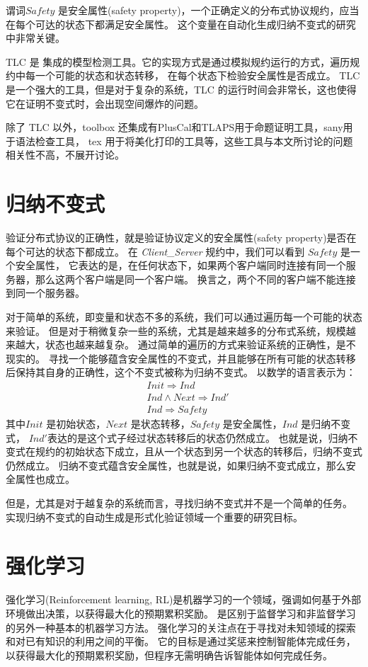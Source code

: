 谓词$Safety$ 是安全属性(safety property)，一个正确定义的分布式协议规约，应当在每个可达的状态下都满足安全属性。
这个变量在自动化生成归纳不变式的研究中非常关键。

TLC 是 \TLA 集成的模型检测工具。它的实现方式是通过模拟规约运行的方式，遍历规约中每一个可能的状态和状态转移，
在每个状态下检验安全属性是否成立。
TLC 是一个强大的工具，但是对于复杂的系统，TLC 的运行时间会非常长，这也使得它在证明不变式时，会出现空间爆炸的问题。

除了 TLC 以外，\TLA toolbox\cite{tla+toolbox} 还集成有PlusCal和TLAPS用于命题证明工具，sany用于语法检查工具，
tex 用于将\TLA 美化打印的工具等，这些工具与本文所讨论的问题相关性不高，不展开讨论。

\section{归纳不变式}
验证分布式协议的正确性，就是验证协议定义的安全属性(safety property)是否在每个可达的状态下都成立。
在 \textit{Client\_Server} 规约中，我们可以看到 $Safety$ 是一个安全属性，
它表达的是，在任何状态下，如果两个客户端同时连接有同一个服务器，那么这两个客户端是同一个客户端。
换言之，两个不同的客户端不能连接到同一个服务器。

对于简单的系统，即变量和状态不多的系统，我们可以通过遍历每一个可能的状态来验证。
但是对于稍微复杂一些的系统，尤其是越来越多的分布式系统，规模越来越大，状态也越来越复杂。
通过简单的遍历的方式来验证系统的正确性，是不现实的。
寻找一个能够蕴含安全属性的不变式，并且能够在所有可能的状态转移后保持其自身的正确性，这个不变式被称为归纳不变式。
以数学的语言表示为：
\begin{equation}
\begin{aligned}
    &Init \Rightarrow Ind \\
    &Ind \land Next \Rightarrow Ind'\\
    &Ind \Rightarrow Safety
\end{aligned}
\end{equation}
其中$Init$ 是初始状态，$Next$ 是状态转移，$Safety$ 是安全属性，$Ind$ 是归纳不变式，
$Ind'$表达的是这个式子经过状态转移后的状态仍然成立。
也就是说，归纳不变式在规约的初始状态下成立，且从一个状态到另一个状态的转移后，归纳不变式仍然成立。
归纳不变式蕴含安全属性，也就是说，如果归纳不变式成立，那么安全属性也成立。

但是，尤其是对于越复杂的系统而言，寻找归纳不变式并不是一个简单的任务。
实现归纳不变式的自动生成是形式化验证领域一个重要的研究目标。

\section{强化学习}
强化学习(Reinforcement learning, RL)\cite{rl}是机器学习的一个领域，强调如何基于外部环境做出决策，以获得最大化的预期累积奖励。
是区别于监督学习和非监督学习的另外一种基本的机器学习方法。
强化学习的关注点在于寻找对未知领域的探索和对已有知识的利用之间的平衡。
它的目标是通过奖惩来控制智能体完成任务，以获得最大化的预期累积奖励，但程序无需明确告诉智能体如何完成任务。

